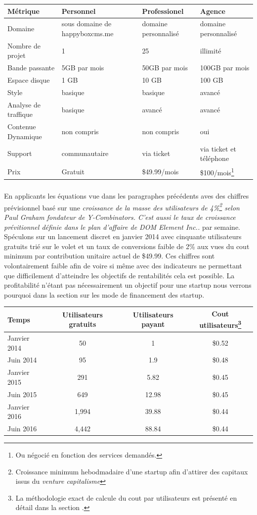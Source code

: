 \documentclass[11pt, a4paper ]{article}
\begin{document}
\begin{center}
	\begin{tabular}{|l|l|l|l|}
		Métrique & Personnel & Professionel & Agence \\
		\hline
		Domaine & sous domaine de happyboxcms.me & domaine personnalisé & domaine personnalisé \\
		Nombre de projet & 1 & 25 & illimité \\
		Bande passante & 5GB par mois & 50GB par mois & 100GB par mois \\
		Espace disque & 1 GB & 10 GB & 100 GB \\
		Style & basique & basique & avancé \\
		Analyse de traffique & basique & avancé & avancé \\
		Contenue Dynamique & non compris & non compris & oui \\
		Support & communautaire & via ticket & via ticket et téléphone  \\
		Prix & Gratuit & \$49.99/mois & \$100/mois\footnote{Ou négocié en fonction des services demandés.} \\

	\end{tabular}
\end{center}
\subparagraph{}
En applicants les équations vue dans les paragraphes précédents aves des chiffres prévisionnel basé sur une \emph{croissance de la masse des utilisateurs de 4\%\footnote{Croissance minimum hebodmadaire d'une startup afin d'attirer des capitaux issus du \emph{venture capitalisme}} selon Paul Graham fondateur de Y-Combinators. C'est aussi le taux de croissance prévitionnel définie dans le plan d'affaire de DOM Element Inc..} par semaine.
Spéculons sur un lancement discret en janvier 2014 avec cinquante utilisateurs gratuits trié sur le volet et un taux de conversions faible de 2\% aux vues du cout minimum par contribution unitaire actuel de \$49.99. Ces chiffres sont volontairement faible afin de voire si même avec des indicateurs ne permettant que difficilement d'atteindre les objectifs de rentabilités cela est possible. La profitabilité n'étant pas nécessairement un objectif pour une startup nous verrons pourquoi dans la section sur les mode de financement des startup.



	\begin{tabular}{|l||c|c|c|}
		Temps & Utilisateurs gratuits & Utilisateurs payant & Cout utilisateurs\footnote{La méthodologie exact de calcule du cout par utilisateurs est présenté en détail dans la section .}\\ %
		\hline
		Janvier 2014 & 50 & 1 & \$0.52 \\
		Juin 2014 & 95 & 1.9 & \$0.48 \\
		Janvier 2015 & 291 & 5.82 & \$0.45 \\
		Juin 2015 & 649 & 12.98 & \$0.45 \\
		Janvier 2016 & 1,994 & 39.88 & \$0.44 \\
		Juin 2016 & 4,442 & 88.84 & \$0.44 \\
	\end{tabular}
	
\end{document}
